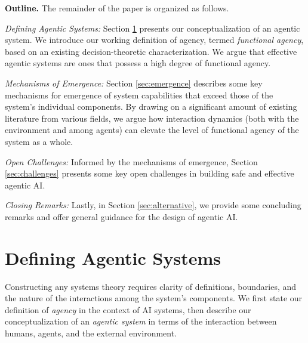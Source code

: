 \documentclass{article}
\theoremstyle{plain}
\theoremstyle{definition}
\theoremstyle{remark}
\begin{document}
{\bf Outline.} The remainder of the paper is organized as follows. 

\emph{Defining Agentic Systems:} Section \ref{sec:def} presents our conceptualization of an agentic system. We introduce our working definition of agency, termed \emph{functional agency}, based on an existing decision-theoretic characterization. We argue that effective agentic systems are ones that possess a high degree of functional agency. 

\emph{Mechanisms of Emergence:} Section \ref{sec:emergence} describes some key mechanisms for emergence of system capabilities that exceed those of the system's individual components. By drawing on a significant amount of existing literature from various fields, we argue how interaction dynamics (both with the environment and among agents) can elevate the level of functional agency of the system as a whole. 

\emph{Open Challenges:} Informed by the mechanisms of emergence, Section \ref{sec:challenges} presents some key open challenges in building safe and effective agentic AI. 

\emph{Closing Remarks:} Lastly, in Section \ref{sec:alternative}, we provide some concluding remarks and offer general guidance for the design of agentic AI.








\section{Defining Agentic Systems}
\label{sec:def}

Constructing any systems theory requires clarity of definitions, boundaries, and the nature of the interactions among the system's components. We first state our definition of \emph{agency} in the context of AI systems, then describe our conceptualization of an \emph{agentic system} in terms of the interaction between humans, agents, and the external environment.
\end{document}
